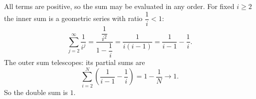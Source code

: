 All terms are positive, so the sum may be evaluated in any order. For fixed $i\ge2$ the inner sum is a geometric series with ratio $\dfrac1i<1$:
\[\sum_{j=2}^{\infty}\dfrac{1}{i^j}=\dfrac{\dfrac{1}{i^2}}{1-\dfrac1i}=\dfrac{1}{i(i-1)}=\dfrac{1}{i-1}-\dfrac1i.\]
The outer sum telescopes: its partial sums are
\[\sum_{i=2}^{N}\left(\dfrac{1}{i-1}-\dfrac1i\right)=1-\dfrac1N\to1.\]
So the double sum is $\boxed{1}$.

